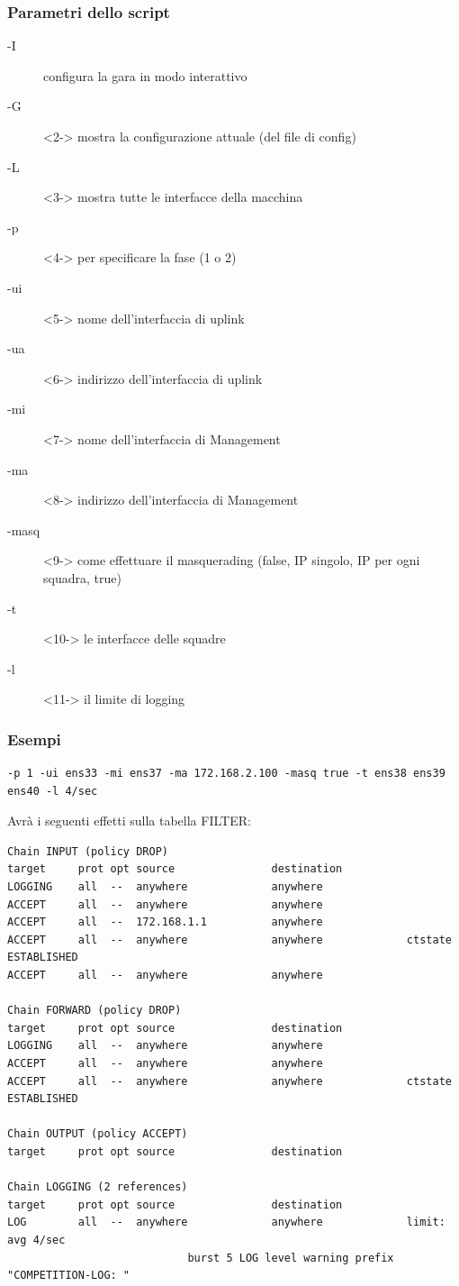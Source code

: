 \documentclass{beamer}
\begin{document}
\begin{frame}
    \frametitle{Parametri dello script}
    \begin{description}
        \item[-I] configura la gara in modo interattivo
        \item[-G]<2-> mostra la configurazione attuale (del file di config)
        \item[-L]<3-> mostra tutte le interfacce della macchina
        \item[-p]<4-> per specificare la fase (1 o 2)
        \item[-ui]<5-> nome dell'interfaccia di uplink
        \item[-ua]<6-> indirizzo dell'interfaccia di uplink
        \item[-mi]<7-> nome dell'interfaccia di Management
        \item[-ma]<8-> indirizzo dell'interfaccia di Management
        \item[-masq]<9-> come effettuare il masquerading (false, IP singolo, IP per ogni squadra, true)
        \item[-t]<10-> le interfacce delle squadre
        \item[-l]<11-> il limite di logging
    \end{description}
\end{frame}

\begin{frame}[fragile]
    \frametitle{Esempi}
    \begin{lstlisting}
-p 1 -ui ens33 -mi ens37 -ma 172.168.2.100 -masq true -t ens38 ens39 ens40 -l 4/sec
    \end{lstlisting}
    Avrà i seguenti effetti sulla tabella FILTER:
    \begin{lstlisting}
Chain INPUT (policy DROP)
target     prot opt source               destination         
LOGGING    all  --  anywhere             anywhere            
ACCEPT     all  --  anywhere             anywhere            
ACCEPT     all  --  172.168.1.1          anywhere            
ACCEPT     all  --  anywhere             anywhere             ctstate ESTABLISHED
ACCEPT     all  --  anywhere             anywhere            

Chain FORWARD (policy DROP)
target     prot opt source               destination         
LOGGING    all  --  anywhere             anywhere            
ACCEPT     all  --  anywhere             anywhere            
ACCEPT     all  --  anywhere             anywhere             ctstate ESTABLISHED

Chain OUTPUT (policy ACCEPT)
target     prot opt source               destination         

Chain LOGGING (2 references)
target     prot opt source               destination         
LOG        all  --  anywhere             anywhere             limit: avg 4/sec 
                            burst 5 LOG level warning prefix "COMPETITION-LOG: "
    \end{lstlisting}
\end{frame}
\end{document}
